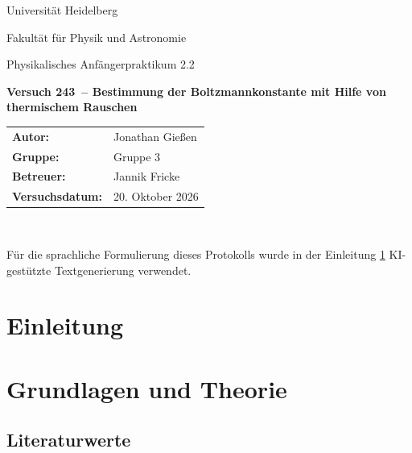 \documentclass[12pt,a4paper,titlepage]{scrartcl}
\numberwithin{equation}{section}
\numberwithin{table}{section}
\numberwithin{figure}{section}
\newcommand{\versuch}{Versuch 243}
\newcommand{\titel}{Bestimmung der
Boltzmannkonstante mit Hilfe von
thermischem Rauschen}
\newcommand{\praktikum}{Physikalisches Anfängerpraktikum 2.2}
\newcommand{\autor}{Jonathan Gießen}
\newcommand{\gruppe}{Gruppe 3}
\newcommand{\datum}{20. Oktober 2026}
\newcommand{\betreuer}{Jannik Fricke}
\begin{document}
\pagestyle{scrheadings}

\begin{titlepage}



    \centering
    \vspace*{4cm}
    {\large Universität Heidelberg\par}
    {\small Fakultät für Physik und Astronomie\par}
    {\Large \praktikum\par}
    \vspace{0.8cm}
    {\LARGE \bfseries \versuch\ -- \titel\par}
    \vspace{1.5cm}

    \begin{tabular}{ll}
        \textbf{Autor:} & \autor\\
        \textbf{Gruppe:} & \gruppe\\
        \textbf{Betreuer:} & \betreuer\\
        \textbf{Versuchsdatum:} & \datum\\
    \end{tabular}

    \vfill
    \hrulefill\
\end{titlepage}

\tableofcontents

\bigskip
\begin{tcolorbox}[colback=gray!5,colframe=gray!60,boxrule=0.8pt,arc=0.01mm,title=KI-Hinweis]
    Für die sprachliche Formulierung dieses Protokolls wurde in der Einleitung \ref{sec:Einleitung} KI-gestützte Textgenerierung verwendet. 
\end{tcolorbox}

\clearpage


\section{Einleitung}\label{sec:Einleitung}


\section{Grundlagen und Theorie}\label{sec:Grundlagen}


\subsection{Literaturwerte}
\end{document}
